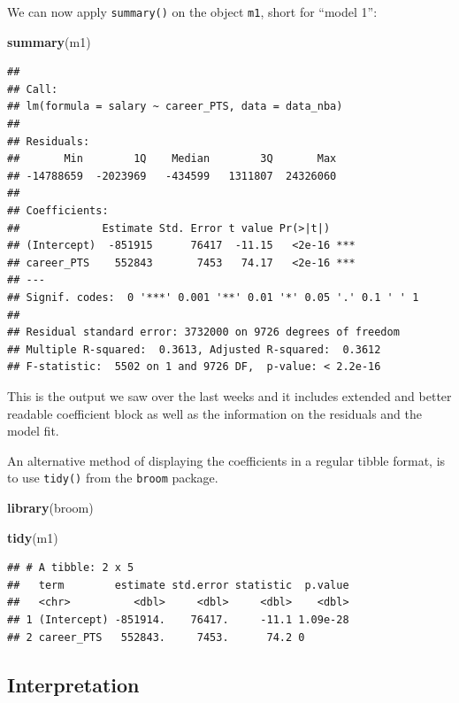 \documentclass[
]{book}
\newenvironment{Shaded}{\begin{snugshade}}{\end{snugshade}}
\newcommand{\FunctionTok}[1]{\textcolor[rgb]{0.13,0.29,0.53}{\textbf{#1}}}
\newcommand{\NormalTok}[1]{#1}
\begin{document}
We can now apply \texttt{summary()} on the object \texttt{m1}, short for ``model 1'':

\begin{Shaded}
\begin{Highlighting}[]
\FunctionTok{summary}\NormalTok{(m1)}
\end{Highlighting}
\end{Shaded}

\begin{verbatim}
## 
## Call:
## lm(formula = salary ~ career_PTS, data = data_nba)
## 
## Residuals:
##       Min        1Q    Median        3Q       Max 
## -14788659  -2023969   -434599   1311807  24326060 
## 
## Coefficients:
##             Estimate Std. Error t value Pr(>|t|)    
## (Intercept)  -851915      76417  -11.15   <2e-16 ***
## career_PTS    552843       7453   74.17   <2e-16 ***
## ---
## Signif. codes:  0 '***' 0.001 '**' 0.01 '*' 0.05 '.' 0.1 ' ' 1
## 
## Residual standard error: 3732000 on 9726 degrees of freedom
## Multiple R-squared:  0.3613, Adjusted R-squared:  0.3612 
## F-statistic:  5502 on 1 and 9726 DF,  p-value: < 2.2e-16
\end{verbatim}

This is the output we saw over the last weeks and it includes extended and
better readable coefficient block as well as the information on the residuals
and the model fit.

An alternative method of displaying the coefficients in a regular tibble format,
is to use \texttt{tidy()} from the \texttt{broom} package.

\begin{Shaded}
\begin{Highlighting}[]
\FunctionTok{library}\NormalTok{(broom)}

\FunctionTok{tidy}\NormalTok{(m1)}
\end{Highlighting}
\end{Shaded}

\begin{verbatim}
## # A tibble: 2 x 5
##   term        estimate std.error statistic  p.value
##   <chr>          <dbl>     <dbl>     <dbl>    <dbl>
## 1 (Intercept) -851914.    76417.     -11.1 1.09e-28
## 2 career_PTS   552843.     7453.      74.2 0
\end{verbatim}

\hypertarget{interpretation}{%
\subsection{Interpretation}\label{interpretation}}
\end{document}

